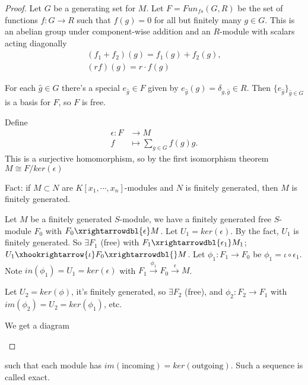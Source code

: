\begin{proof}
Let $G$ be a generating set for $M$. Let $F = Fun_{f s} (G,R)$ be the set of functions $f : G \to R$ such that $f(g) = 0$ for all but finitely many $g \in G$. This is an abelian group under component-wise addition and an $R $-module with scalars acting diagonally
\begin{align*}
    (f_1 + f_2 ) (g) = f_1(g) + f_2(g),\\
    (rf)(g) = r \cdot f(g)
\end{align*}

For each $\hat{g} \in G$ there's a special $e_{\hat{g}} \in F$ given by $e_{\hat{g}} ( g) = \delta_{{g, \hat{g}}} \in R$. Then $\{ e_{\hat{g}} \}_{\hat{g} \in G}$ is a basis for $F$, so $F$ is free.

Define 
\begin{align*}
    \epsilon : F &\to M\\
    f &\mapsto \sum_{g \in G} f(g) g.
\end{align*}
This is a surjective homomorphism, so by the first isomorphism theorem $M \cong F / ker(\epsilon)$

Fact: if $M \subset N$ are $K [ x_1, \cdots, x_n ] $-modules and $N  $ is finitely generated, then $M$ is finitely generated.

Let $M $ be a finitely generated $S$-module, we have a finitely generated free $S$-module $F_0$ with $F_0 \xrightarrowdbl{\epsilon} M $. Let $U_1 = ker (\epsilon)$. By the fact, $U_1$ is finitely generated. So $\exists F_1 $ (free) with $F_1 \xrightarrowdbl{\epsilon_1} M_1$; $U_1 \xhookrightarrow{\iota} F_0 \xrightarrowdbl{} M$. Let $\phi_1: F_1 \to F_0$ be $\phi_1 = \iota \circ \epsilon_1$. Note $in(\phi_1) = U_1 = ker(\epsilon)$ with $F_1 \xrightarrow{\phi_1} F_0 \xrightarrow{\epsilon}M$.

Let $U_2 = ker(\phi)$, it's finitely generated, so $\exists F_2$ (free), and $\phi_2 : F_2 \to F_1$ with $im (\phi_2) = U_2 = ker(\phi_1) $, etc.

We get a diagram
\begin{center}
\end{center}
\end{proof}

such that each module has $im(\text{incoming}) = ker(\text{outgoing})$. Such a sequence is called exact.

